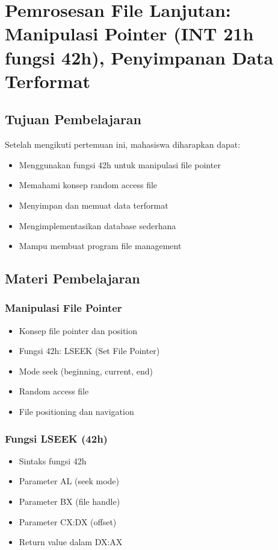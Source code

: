 \chapter{Pemrosesan File Lanjutan: Manipulasi Pointer (INT 21h fungsi 42h), Penyimpanan Data Terformat}

\section{Tujuan Pembelajaran}
Setelah mengikuti pertemuan ini, mahasiswa diharapkan dapat:
\begin{itemize}
\item Menggunakan fungsi 42h untuk manipulasi file pointer
\item Memahami konsep random access file
\item Menyimpan dan memuat data terformat
\item Mengimplementasikan database sederhana
\item Mampu membuat program file management
\end{itemize}

\section{Materi Pembelajaran}

\subsection{Manipulasi File Pointer}
\begin{itemize}
\item Konsep file pointer dan position
\item Fungsi 42h: LSEEK (Set File Pointer)
\item Mode seek (beginning, current, end)
\item Random access file
\item File positioning dan navigation
\end{itemize}

\subsection{Fungsi LSEEK (42h)}
\begin{itemize}
\item Sintaks fungsi 42h
\item Parameter AL (seek mode)
\item Parameter BX (file handle)
\item Parameter CX:DX (offset)
\item Return value dalam DX:AX
\end{itemize}

